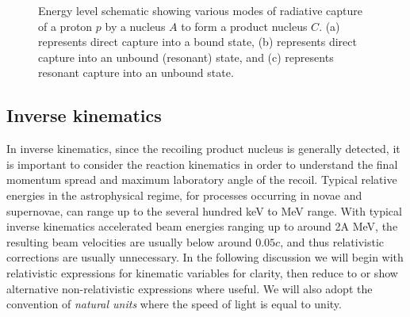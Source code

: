 \begin{figure}
\caption{Energy level schematic showing various modes of radiative capture of a proton $p$ by a nucleus $A$ to form a product nucleus $C$. (a) represents direct capture into a bound state, (b) represents direct capture into an unbound (resonant) state, and (c) represents resonant capture into an unbound state.}
\label{fig:radcap}       %
\end{figure}


\subsection{Inverse kinematics}

In inverse kinematics, since the recoiling product nucleus is generally detected, it is important to consider the reaction kinematics in order to understand the final momentum spread and maximum laboratory angle of the recoil. Typical relative energies in the astrophysical regime, for processes occurring in novae and supernovae, can range up to the several hundred keV to MeV range. With typical inverse kinematics accelerated beam energies ranging up to around 2A MeV, the resulting beam velocities are usually below around $0.05c$, and thus relativistic corrections are usually unnecessary. In the following discussion we will begin with relativistic expressions for kinematic variables for clarity, then reduce to or show alternative non-relativistic expressions where useful. We will also adopt the convention of {\em natural units} where the speed of light is equal to unity.

